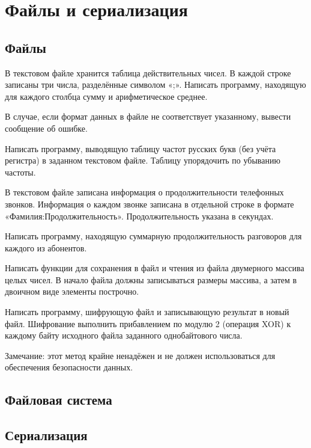 \section{Файлы и сериализация}

\subsection{Файлы}

\task В текстовом файле хранится таблица действительных чисел. В
каждой строке записаны три числа, разделённые символом «;». Написать
программу, находящую для каждого столбца сумму и арифметическое
среднее.

В случае, если формат данных в файле не соответствует указанному,
вывести сообщение об ошибке.

\task Написать программу, выводящую таблицу частот русских букв (без
учёта регистра) в заданном текстовом файле. Таблицу упорядочить по
убыванию частоты.

\task В текстовом файле записана информация о продолжительности
телефонных звонков.  Информация о каждом звонке записана в отдельной
строке в формате «Фамилия:Продолжительность». Продолжительность
указана в секундах.

Написать программу, находящую суммарную продолжительность разговоров
для каждого из абонентов.

\task Написать функции для сохранения в файл и чтения из файла
двумерного массива целых чисел. В начало файла должны записываться
размеры массива, а затем в двоичном виде элементы построчно.

\task Написать программу, шифрующую файл и записывающую результат в
новый файл. Шифрование выполнить прибавлением по модулю 2 (операция
XOR) к каждому байту исходного файла заданного однобайтового числа.

Замечание: этот метод крайне ненадёжен и не должен использоваться
для обеспечения безопасности данных.

\task

\task 

\task

\task 

\task


\subsection{Файловая система}

\task

\task

\task

\task

\task

\task

\task

\task

\task

\task


\subsection{Сериализация}

\task

\task

\task

\task

\task

\task

\task

\task

\task

\task


